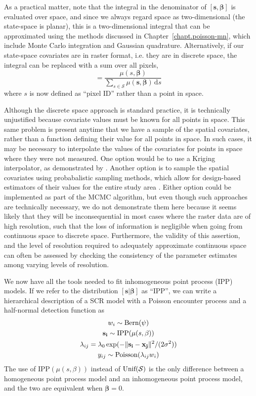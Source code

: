 As a practical matter, note that the integral in the
denominator of $[\mathbf{s}, \bm{\beta}]$ is evaluated over space, and since we always regard
space as two-dimensional (the state-space is planar), this is a two-dimensional integral that can
be approximated using the methods discussed in
Chapter~\ref{chapt.poisson-mn}, which include
Monte Carlo integration and Gaussian quadrature. Alternatively, if
our state-space covariates are in raster format, i.e. they are
in discrete space, the integral can be replaced with a sum over
all pixels,
\begin{equation}
[\mathbf{s}, \bm{\beta}] = \frac{\mu(s, \bm{\beta})}{\sum_{s \in \mathcal{S}} \mu(\mathbf{s}, \bm{\beta})\, \mathrm{d}s}
\label{eq.pdf.dipp.d}
\end{equation}
where $s$ is now defined as ``pixel ID'' rather than a point in space.

Although the discrete space approach is standard practice, it is
technically unjustified because covariate values must be known for all
points in space. This same problem is present anytime that we have a
sample of the spatial covariates, rather than a function defining
their value for all points in space. In such cases, it may be necessary to
interpolate the values of the covariates for points in space where
they were not measured. One option would be to use a Kriging
interpolator, as demonstrated by \citet{rathbun:1996}. Another option
is to sample the spatial covariates using probabalistic sampling
methods, which allow for design-based estimators of their values for
the entire study area \citep{rathbun_etal:2007}. Either option could
be implemented as part of the MCMC algorithm, but even though such
approaches are technically necessary, we do not demonstrate them here
because it seems likely that they will be inconsequential in most
cases where the raster data are of high resolution, such that the loss
of information is negligible when going from continuous space to
discrete space. Furthermore, the validity of this assertion, and the
level of resolution required to adequately approximate continuous
space can often be assessed by checking the consistency of the
parameter estimates among varying levels of resolution.

We now have all the tools needed to fit inhomogeneous point process
(IPP) models. If we refer to the distribution $[\mathbf{s} |
\bm{\beta}]$ as ``IPP'', we can write a
hierarchical description of a SCR model with a Poisson encounter
process and a half-normal detection function as
\begin{gather*}
w_i \sim \mbox{Bern}(\psi) \\
{\bf s_i} \sim \mbox{IPP}(\mu(s,\beta)) \\
\lambda_{ij} = \lambda_0 \exp(-\|{\bf s_i} - {\bf x_{j}}\|^2/(2\sigma^2)) \\
y_{ij} \sim \mbox{Poisson}(\lambda_{ij} w_i)
\end{gather*}
The use of $\mbox{IPP}(\mu(s, \beta))$ instead of
$\mbox{Unif}(\cal{S})$ is the only difference between a homogeneous
point process model and an inhomogeneous point process model, and the
two are equivalent when $\bm{\beta}=0$.

